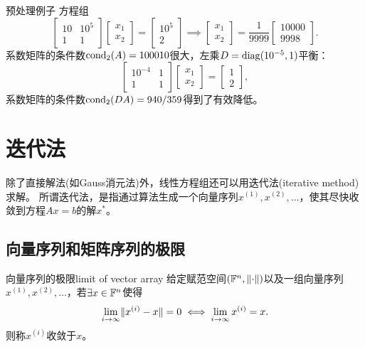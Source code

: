 \begin{example}
    {预处理例子}{}
    方程组
    \[
        \begin{bmatrix}
            10&10^5\\1&1
        \end{bmatrix}\begin{bmatrix}
            x_1\\x_2
        \end{bmatrix} = \begin{bmatrix}
            10^5\\2
        \end{bmatrix} \implies \begin{bmatrix}
            x_1\\x_2
        \end{bmatrix} = \frac1{9999}\begin{bmatrix}
            10000\\9998
        \end{bmatrix}.
    \]
    系数矩阵的条件数$\operatorname{cond}_2(A) = 100010$很大，左乘$D = \operatorname{diag}(10^{-5},1)$平衡：
    \[
        \begin{bmatrix}
            10^{-4}&1\\1&1
        \end{bmatrix}\begin{bmatrix}
            x_1\\x_2
        \end{bmatrix} = \begin{bmatrix}
            1\\2
        \end{bmatrix},
    \]
    系数矩阵的条件数$\operatorname{cond}_2(DA) = 940/359$得到了有效降低。
\end{example}

\section{迭代法}

除了直接解法(如Gauss消元法)外，线性方程组还可以用迭代法(iterative method)求解。
所谓迭代法，是指通过算法生成一个向量序列$x^{(1)},x^{(2)},\ldots$，使其尽快收敛到方程$Ax = b$的解$x^*$。

\subsection{向量序列和矩阵序列的极限}

\begin{definition}
    {向量序列的极限}{limit of vector array}
    给定赋范空间$(\mathbb{F}^n,\lVert\cdot\rVert)$以及一组向量序列$x^{(1)},x^{(2)},\ldots$，若$\exists x \in \mathbb{F}^n$使得
    \begin{equation}
        \lim_{i\to\infty}\lVert x^{(i)} - x\rVert = 0 \iff \lim_{i\to\infty}x^{(i)} = x.
    \end{equation}
    则称$x^{(i)}$收敛于$x$。
\end{definition}

